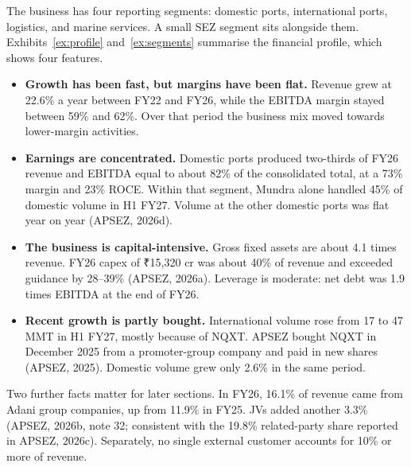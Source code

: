 \documentclass[12pt, a4paper]{article}
\begin{document}
The business has four reporting segments: domestic ports, international ports,
logistics, and marine services. A small SEZ segment sits alongside them.
Exhibits~\ref{ex:profile} and~\ref{ex:segments} summarise the financial profile,
which shows four features.
\begin{itemize}
  \item \textbf{Growth has been fast, but margins have been flat.} Revenue grew
        at 22.6\% a year between FY22 and FY26, while the EBITDA margin stayed
        between 59\% and 62\%. Over that period the business mix moved towards
        lower-margin activities.
  \item \textbf{Earnings are concentrated.} Domestic ports produced two-thirds
        of FY26 revenue and EBITDA equal to about 82\% of the consolidated total,
        at a 73\% margin and 23\% ROCE. Within that segment, Mundra alone handled
        45\% of domestic volume in H1 FY27. Volume at the other domestic ports
        was flat year on year (APSEZ, 2026d).
  \item \textbf{The business is capital-intensive.} Gross fixed assets are about
        4.1 times revenue. FY26 capex of ₹15,320 cr was about 40\% of revenue and
        exceeded guidance by 28--39\% (APSEZ, 2026a). Leverage is moderate: net
        debt was 1.9 times EBITDA at the end of FY26.
  \item \textbf{Recent growth is partly bought.} International volume rose from
        17 to 47 MMT in H1 FY27, mostly because of NQXT. APSEZ bought NQXT in
        December 2025 from a promoter-group company and paid in new shares
        (APSEZ, 2025). Domestic volume grew only 2.6\% in the same period.
\end{itemize}

Two further facts matter for later sections. In FY26, 16.1\% of revenue came
from Adani group companies, up from 11.9\% in FY25. JVs added another 3.3\%
(APSEZ, 2026b, note 32; consistent with the 19.8\% related-party share reported
in APSEZ, 2026c). Separately, no single external customer accounts for 10\% or
more of revenue.
\end{document}
